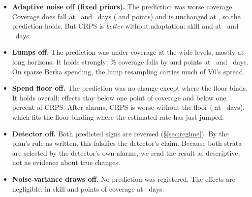 \begin{itemize}
\item \textbf{Adaptive noise off (fixed priors).} The prediction was worse
  coverage. Coverage does fall at \hA\ and \hC\ days
  ( and
   points) and is unchanged
  at \hB, so the prediction holds. But CRPS is \emph{better} without
  adaptation: skill  and
   at \hB\ and \hC\ days.
\item \textbf{Lumps off.} The prediction was under-coverage at the wide
  levels, mostly at long horizons. It holds strongly: \lC\% coverage falls
  by  and
   points at \hB\ and \hC\ days.
  On sparse Berka spending, the lump resampling carries much of V0's
  spread.
\item \textbf{Spend floor off.} The prediction was no change except where
  the floor binds. It holds overall: effects stay below one point of
  coverage and below one percent of CRPS. After alarms, CRPS is worse
  without the floor
  ( at
  \hC\ days), which fits the floor binding where the estimated rate has
  just jumped.
\item \textbf{Detector off.} Both predicted signs are reversed
  (\S\ref{sec:regime}). By the plan's rule as written, this falsifies
  the detector's claim. Because both strata are selected by the detector's
  own alarms, we read the result as descriptive, not as evidence about
  true changes.
\item \textbf{Noise-variance draws off.} No prediction was registered.
  The effects are negligible:
   in skill and
   points of coverage at
  \hC\ days.
\end{itemize}

\begin{table}[htbp]
\centering\footnotesize
{}
\caption{Regime detection on synthetic data with a known change day
( seeds per scenario, detector on). Recovery: the estimate
stays within a quarter of the step for  days. False alarms
are counted in the same seeds with no step.}
\label{tab:detection}
\end{table}
